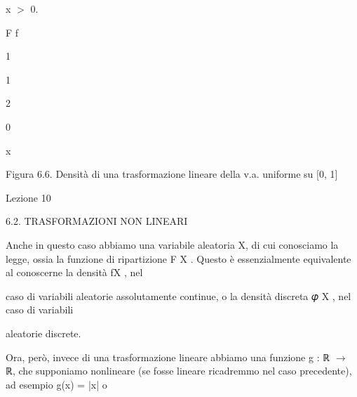 \documentclass[a4paper,portrait,12pt]{article}
\begin{document}
\begin{flushleft}
x $>$ 0.
\end{flushleft}





\begin{flushleft}
F f
\end{flushleft}


1


1


2





0





\begin{flushleft}
x
\end{flushleft}





\begin{flushleft}
Figura 6.6. Densit\`{a} di una trasformazione lineare della v.a. uniforme su [0, 1]
\end{flushleft}





\begin{flushleft}
Lezione 10
\end{flushleft}





\begin{flushleft}
6.2. TRASFORMAZIONI NON LINEARI
\end{flushleft}


\begin{flushleft}
Anche in questo caso abbiamo una variabile aleatoria X, di cui conosciamo la legge, ossia la funzione di ripartizione F X . Questo \`{e} essenzialmente equivalente al conoscerne la densit\`{a} fX , nel
\end{flushleft}


\begin{flushleft}
caso di variabili aleatorie assolutamente continue, o la densit\`{a} discreta 𝜑 X , nel caso di variabili
\end{flushleft}


\begin{flushleft}
aleatorie discrete.
\end{flushleft}


\begin{flushleft}
Ora, per\`{o}, invece di una trasformazione lineare abbiamo una funzione g : ℝ $\rightarrow$ ℝ, che supponiamo nonlineare (se fosse lineare ricadremmo nel caso precedente), ad esempio g(x) = |x| o
\end{flushleft}
\end{document}
